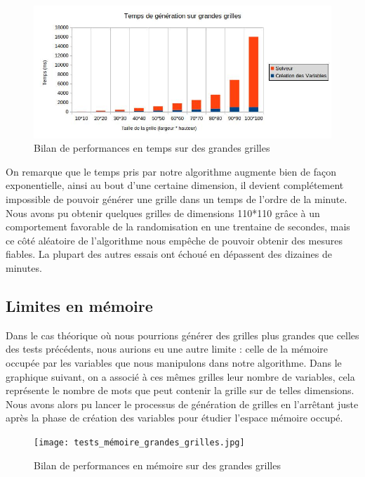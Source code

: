 \documentclass [ 11 pt ] {article}
\begin{document}
            \begin{figure}[H] 
                \center 
                \includegraphics[width=0.9\linewidth]{tests_temps_grandes_grilles.jpg}
                \caption{Bilan de performances en temps sur des grandes grilles}
            \end{figure}
            
            On remarque que le temps pris par notre algorithme augmente bien de façon exponentielle, ainsi au bout d'une certaine dimension, il devient complétement impossible de pouvoir générer une grille dans un temps de l'ordre de la minute. Nous avons pu obtenir quelques grilles de dimensions 110*110 grâce à un comportement favorable de la randomisation en une trentaine de secondes, mais ce côté aléatoire de l'algorithme nous empêche de pouvoir obtenir des mesures fiables. La plupart des autres essais ont échoué en dépassent des dizaines de minutes.
        
        \subsection{Limites en mémoire}
            Dans le cas théorique où nous pourrions générer des grilles plus grandes que celles des tests précédents, nous aurions eu une autre limite : celle de la mémoire occupée par les variables que nous manipulons dans notre algorithme. Dans le graphique suivant, on a associé à ces mêmes grilles leur nombre de variables, cela représente le nombre de mots que peut contenir la grille sur de telles dimensions. Nous avons alors pu lancer le processus de génération de grilles en l'arrêtant juste après la phase de création des variables pour étudier l'espace mémoire occupé.
        
            \begin{figure}[H] 
                \center 
                \texttt{[image: tests\_mémoire\_grandes\_grilles.jpg]}
                \caption{Bilan de performances en mémoire sur des grandes grilles}
            \end{figure}
        
\end{document}
